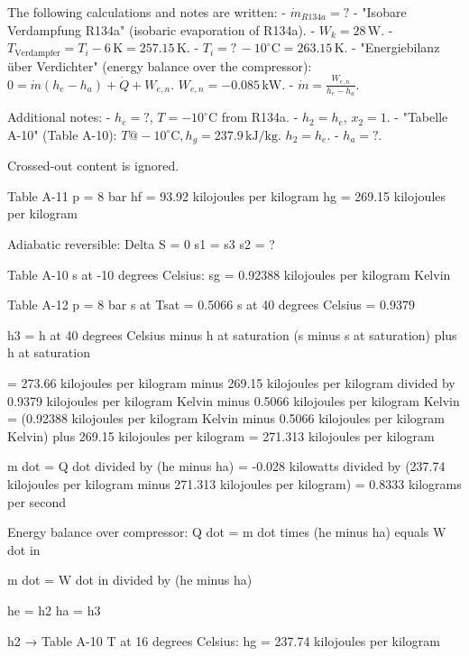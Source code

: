 The following calculations and notes are written:  
- \( \dot{m}_{R134a} = ? \)  
- "Isobare Verdampfung R134a" (isobaric evaporation of R134a).  
- \( W_k = 28 \, \text{W} \).  
- \( T_{\text{Verdampfer}} = T_i - 6 \, \text{K} = 257.15 \, \text{K} \).  
- \( T_i = ? \, -10^\circ \text{C} = 263.15 \, \text{K} \).  
- "Energiebilanz über Verdichter" (energy balance over the compressor):  
  \( 0 = \dot{m} (h_e - h_a) + \dot{Q} + W_{e,n} \).  
  \( W_{e,n} = -0.085 \, \text{kW} \).  
- \( \dot{m} = \frac{W_{e,n}}{h_e - h_a} \).  

Additional notes:  
- \( h_e = ? \), \( T = -10^\circ \text{C} \) from R134a.  
- \( h_2 = h_e \), \( x_2 = 1 \).  
- "Tabelle A-10" (Table A-10):  
  \( T@ -10^\circ \text{C}, h_g = 237.9 \, \text{kJ/kg} \).  
  \( h_2 = h_e \).  
- \( h_a = ? \).  

Crossed-out content is ignored.

Table A-11  
p = 8 bar  
hf = 93.92 kilojoules per kilogram  
hg = 269.15 kilojoules per kilogram  

Adiabatic reversible:  
Delta S = 0  
s1 = s3  
s2 = ?  

Table A-10  
s at -10 degrees Celsius: sg = 0.92388 kilojoules per kilogram Kelvin  

Table A-12  
p = 8 bar  
s at Tsat = 0.5066  
s at 40 degrees Celsius = 0.9379  

h3 = h at 40 degrees Celsius minus h at saturation  
(s minus s at saturation) plus h at saturation  

= 273.66 kilojoules per kilogram minus 269.15 kilojoules per kilogram divided by 0.9379 kilojoules per kilogram Kelvin minus 0.5066 kilojoules per kilogram Kelvin  
= (0.92388 kilojoules per kilogram Kelvin minus 0.5066 kilojoules per kilogram Kelvin) plus 269.15 kilojoules per kilogram  
= 271.313 kilojoules per kilogram  

m dot = Q dot divided by (he minus ha)  
= -0.028 kilowatts divided by (237.74 kilojoules per kilogram minus 271.313 kilojoules per kilogram)  
= 0.8333 kilograms per second  

Energy balance over compressor:  
Q dot = m dot times (he minus ha) equals W dot in  

m dot = W dot in divided by (he minus ha)  

he = h2  
ha = h3  

h2 → Table A-10  
T at 16 degrees Celsius: hg = 237.74 kilojoules per kilogram